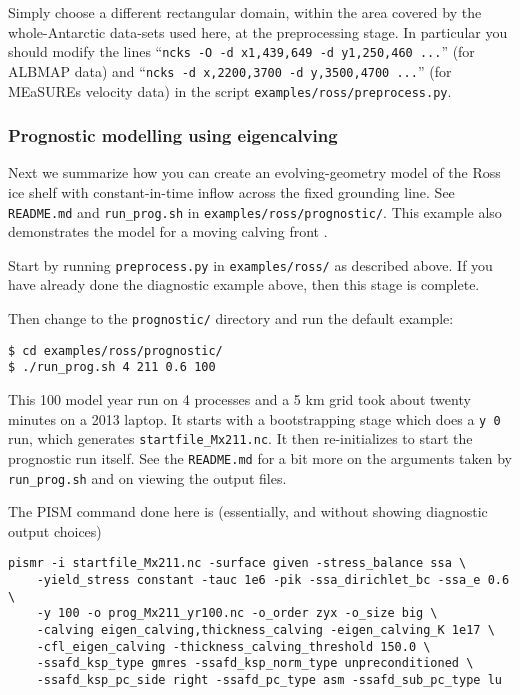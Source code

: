 Simply choose a different rectangular domain, within the area covered by the whole-Antarctic data-sets used here, at the preprocessing stage.  In particular you should modify the lines ``\texttt{ncks -O -d x1,439,649 -d y1,250,460 ...}'' (for ALBMAP data) and ``\texttt{ncks -d x,2200,3700 -d y,3500,4700 ...}'' (for MEaSUREs velocity data) in the script \texttt{examples/ross/preprocess.py}.

\subsubsection*{Prognostic modelling using eigencalving}  Next we summarize how you can create an evolving-geometry model of the Ross ice shelf with constant-in-time inflow across the fixed grounding line.  See \texttt{README.md} and \texttt{run_prog.sh} in \texttt{examples/ross/prognostic/}.  This example also demonstrates the  model for a moving calving front \cite{Levermannetal2012}.

Start by running \texttt{preprocess.py} in \texttt{examples/ross/} as described above.  If you have already done the diagnostic example above, then this stage is complete.

Then change to the \texttt{prognostic/} directory and run the default example:

\begin{verbatim}
$ cd examples/ross/prognostic/
$ ./run_prog.sh 4 211 0.6 100
\end{verbatim}%

\noindent This 100 model year run on 4 processes and a 5 km grid took about twenty minutes on a 2013 laptop.  It starts with a bootstrapping stage which does a \texttt{y 0} run, which generates \texttt{startfile_Mx211.nc}.  It then re-initializes to start the prognostic run itself.  See the \texttt{README.md} for a bit more on the arguments taken by \texttt{run_prog.sh} and on viewing the output files.

The PISM command done here is (essentially, and without showing diagnostic output choices)

\begin{verbatim}
pismr -i startfile_Mx211.nc -surface given -stress_balance ssa \
    -yield_stress constant -tauc 1e6 -pik -ssa_dirichlet_bc -ssa_e 0.6 \
    -y 100 -o prog_Mx211_yr100.nc -o_order zyx -o_size big \
    -calving eigen_calving,thickness_calving -eigen_calving_K 1e17 \
    -cfl_eigen_calving -thickness_calving_threshold 150.0 \
    -ssafd_ksp_type gmres -ssafd_ksp_norm_type unpreconditioned \
    -ssafd_ksp_pc_side right -ssafd_pc_type asm -ssafd_sub_pc_type lu
\end{verbatim}%

